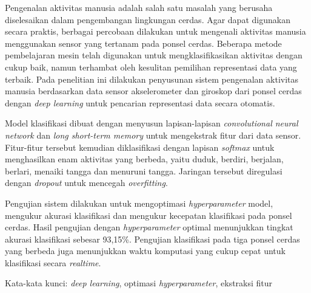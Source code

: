 \begin{abstractind}
    Pengenalan aktivitas manusia adalah salah satu masalah yang berusaha diselesaikan dalam pengembangan lingkungan cerdas. Agar dapat digunakan secara praktis, berbagai percobaan dilakukan untuk mengenali aktivitas manusia menggunakan sensor yang tertanam pada ponsel cerdas. Beberapa metode pembelajaran mesin telah digunakan untuk mengklasifikasikan aktivitas dengan cukup baik, namun terhambat oleh kesulitan pemilihan representasi data yang terbaik. Pada penelitian ini dilakukan penyusunan sistem pengenalan aktivitas manusia berdasarkan data sensor akselerometer dan giroskop dari ponsel cerdas dengan \textit{deep learning} untuk pencarian representasi data secara otomatis.

    Model klasifikasi dibuat dengan menyusun lapisan-lapisan \textit{convolutional neural network} dan \textit{long short-term memory} untuk mengekstrak fitur dari data sensor. Fitur-fitur tersebut kemudian diklasifikasi dengan lapisan \textit{softmax} untuk menghasilkan enam aktivitas yang berbeda, yaitu duduk, berdiri, berjalan, berlari, menaiki tangga dan menuruni tangga. Jaringan tersebut diregulasi dengan \textit{dropout} untuk mencegah \textit{overfitting}.

    Pengujian sistem dilakukan untuk mengoptimasi \textit{hyperparameter} model, mengukur akurasi klasifikasi dan mengukur kecepatan klasifikasi pada ponsel cerdas. Hasil pengujian dengan \textit{hyperparameter} optimal menunjukkan tingkat akurasi klasifikasi sebesar 93,15\%. Pengujian klasifikasi pada tiga ponsel cerdas yang berbeda juga menunjukkan waktu komputasi yang cukup cepat untuk klasifikasi secara \textit{realtime}.

    \bigskip
    Kata-kata kunci: \textit{deep learning}, optimasi \textit{hyperparameter}, ekstraksi fitur
\end{abstractind}

